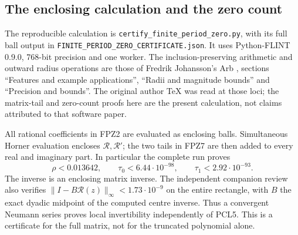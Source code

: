 \documentclass[11pt]{article}
\begin{document}
\subsection{The enclosing calculation and the zero count}
The reproducible calculation is
\texttt{certify\_finite\_period\_zero.py}, with its full ball output in
\texttt{FINITE\_PERIOD\_ZERO\_CERTIFICATE.json}.
It uses Python-FLINT 0.9.0, 768-bit precision and one worker.
The inclusion-preserving arithmetic and outward radius operations are
those of Fredrik Johansson's Arb \cite{human:arb2016}, sections
``Features and example applications'', ``Radii and magnitude bounds''
and ``Precision and bounds''. The original author TeX was read at
those loci; the matrix-tail and zero-count proofs here are the present
calculation, not claims attributed to that software paper.

All rational coefficients in FPZ2 are evaluated as enclosing balls.
Simultaneous Horner evaluation encloses $\mathcal R,\mathcal R'$;
the two tails in FPZ7 are then added to every real and imaginary part.
In particular the complete run proves
\[
 \rho<0.013642,\qquad \tau_0<6.44\cdot10^{-98},\qquad
 \tau_1<2.92\cdot10^{-93}.
 \tag{FPZ8}
\]
The inverse is an enclosing matrix inverse. The independent companion
review also verifies $\|I-B\mathcal R(z)\|_\infty<1.73\cdot10^{-9}$
on the entire rectangle, with $B$ the exact dyadic midpoint of the
computed centre inverse. Thus a convergent Neumann series proves local
invertibility independently of PCL5. This is a certificate for the
full matrix, not for the truncated polynomial alone.
\end{document}
